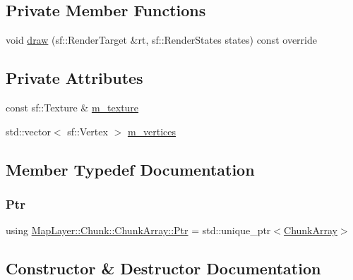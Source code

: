 \subsection*{Private Member Functions}
\begin{DoxyCompactItemize}
\item 
void \hyperlink{classMapLayer_1_1Chunk_1_1ChunkArray_a9eb79b994907878e26c521a4d0c111b4}{draw} (sf\+::\+Render\+Target \&rt, sf\+::\+Render\+States states) const override
\end{DoxyCompactItemize}
\subsection*{Private Attributes}
\begin{DoxyCompactItemize}
\item 
const sf\+::\+Texture \& \hyperlink{classMapLayer_1_1Chunk_1_1ChunkArray_a84294fb3f90d1363a3095a978f0b89f8}{m\+\_\+texture}
\item 
std\+::vector$<$ sf\+::\+Vertex $>$ \hyperlink{classMapLayer_1_1Chunk_1_1ChunkArray_a43fbfdccc94de7aa7e3f822d93789dc6}{m\+\_\+vertices}
\end{DoxyCompactItemize}


\subsection{Member Typedef Documentation}
\mbox{\label{classMapLayer_1_1Chunk_1_1ChunkArray_a6d944dee2fc89a76d7a252405e2732b0}} 
\subsubsection{\texorpdfstring{Ptr}{Ptr}}
{\footnotesize\ttfamily using \hyperlink{classMapLayer_1_1Chunk_1_1ChunkArray_a6d944dee2fc89a76d7a252405e2732b0}{Map\+Layer\+::\+Chunk\+::\+Chunk\+Array\+::\+Ptr} =  std\+::unique\+\_\+ptr$<$\hyperlink{classMapLayer_1_1Chunk_1_1ChunkArray}{Chunk\+Array}$>$}



\subsection{Constructor \& Destructor Documentation}
\mbox{\label{classMapLayer_1_1Chunk_1_1ChunkArray_a566f7f2c8c1fd2405ed8a359a9cf8717}} 
